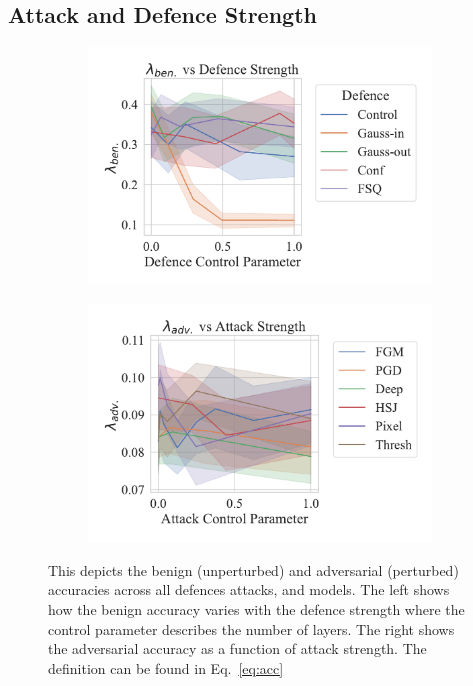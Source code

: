 \subsection{Attack and Defence Strength}
\begin{figure}
    \centering
    \begin{subfigure}{0.49\textwidth}
        \centering
        \includegraphics[width=\textwidth]{cifar/def_param_vs_accuracy.pdf}
    \end{subfigure}
    \begin{subfigure}{0.49\textwidth}
        \centering
        \includegraphics[width=\textwidth]{cifar/atk_param_vs_accuracy.pdf}
    \end{subfigure}
    \caption{This depicts the benign (unperturbed) and adversarial (perturbed) accuracies across all defences attacks, and models. The left shows how the benign accuracy varies with the defence strength where the control parameter describes the number of layers. The right shows the adversarial accuracy as a function of attack strength. The definition can be found in Eq.~\ref{eq:acc}}
    \label{fig:strength}
\end{figure}


